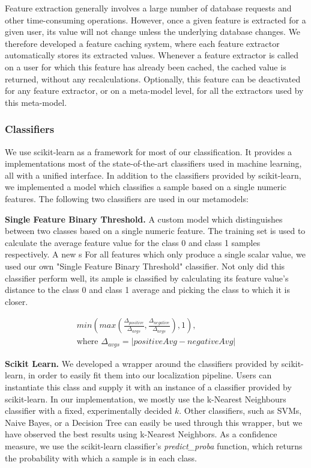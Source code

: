 \documentclass[10pt,a4paper]{article}
\begin{document}
Feature extraction generally involves a large number of database requests and other time-consuming operations. However, once a given feature is extracted for a given user, its value will not change unless the underlying database changes. We therefore developed a feature caching system, where each feature extractor automatically stores its extracted values. Whenever a feature extractor is called on a user for which this feature has already been cached, the cached value is returned, without any recalculations. Optionally, this feature can be deactivated for any feature extractor, or on a meta-model level, for all the extractors used by this meta-model.

\subsubsection{Classifiers}
We use scikit-learn as a framework for most of our classification. It provides a implementations most of the state-of-the-art classifiers used in machine learning, all with a unified interface. In addition to the classifiers provided by scikit-learn, we implemented a model which classifies a sample based on a single numeric features. The following two classifiers are used in our metamodels:

\textbf{Single Feature Binary Threshold.} A custom model which distinguishes between two classes based on a single numeric feature. The training set is used to calculate the average feature value for the class 0 and class 1 samples respectively. A new s For all features which only produce a single scalar value, we used our own "Single Feature Binary Threshold" classifier. Not only did this classifier perform well, its ample is classified by calculating its feature value's distance to the class 0 and class 1 average and picking the class to which it is closer.

\begin{equation}
\begin{split}
min(max(\frac{\Delta_{positive}}{\Delta_{avgs}}, \frac{\Delta_{negative}}{\Delta_{avgs}}), 1), \\
\text{where } \Delta_{avgs} = |positiveAvg - negativeAvg|
\end{split}
\end{equation}

\textbf{Scikit Learn.} We developed a wrapper around the classifiers provided by scikit-learn, in order to easily fit them into our localization pipeline. Users can instantiate this class and supply it with an instance of a classifier provided by scikit-learn. In our implementation, we mostly use the k-Nearest Neighbours classifier with a fixed, experimentally decided $k$. Other classifiers, such as SVMs, Naive Bayes, or a Decision Tree can easily be used through this wrapper, but we have observed the best results using k-Nearest Neighbors. As a confidence measure, we use the scikit-learn classifier's \textit{predict\_proba} function, which returns the probability with which a sample is in each class.
\end{document}
